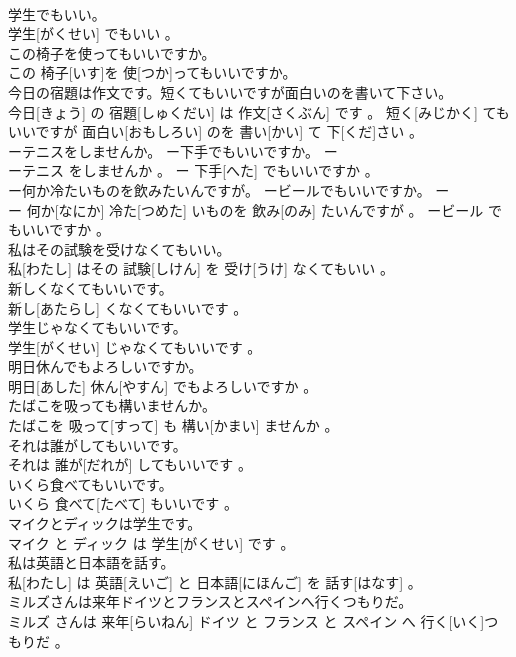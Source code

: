 \documentclass[8pt]{extreport}
\begin{document}
\begin{CJK}{UTF8}{min}
\\	学生でもいい。	
\\	学生[がくせい] でもいい 。
\\	この椅子を使ってもいいですか。	
\\	この 椅子[いす]を 使[つか]ってもいいですか。
\\	今日の宿題は作文です。短くてもいいですが面白いのを書いて下さい。	
\\	今日[きょう] の 宿題[しゅくだい] は 作文[さくぶん] です 。 短く[みじかく] てもいいですが 面白い[おもしろい] のを 書い[かい] て 下[くだ]さい 。
\\	ーテニスをしませんか。 ー下手でもいいですか。	ー
\\	ーテニス をしませんか 。 ー 下手[へた] でもいいですか 。
\\	ー何か冷たいものを飲みたいんですが。 ービールでもいいですか。	ー
\\	ー 何か[なにか] 冷た[つめた] いものを 飲み[のみ] たいんですが 。 ービール でもいいですか 。
\\	私はその試験を受けなくてもいい。	
\\	私[わたし] はその 試験[しけん] を 受け[うけ] なくてもいい 。
\\	新しくなくてもいいです。	
\\	新し[あたらし] くなくてもいいです 。
\\	学生じゃなくてもいいです。	
\\	学生[がくせい] じゃなくてもいいです 。
\\	明日休んでもよろしいですか。	
\\	明日[あした] 休ん[やすん] でもよろしいですか 。
\\	たばこを吸っても構いませんか。	
\\	たばこを 吸って[すって] も 構い[かまい] ませんか 。
\\	それは誰がしてもいいです。	
\\	それは 誰が[だれが] してもいいです 。
\\	いくら食べてもいいです。	
\\	いくら 食べて[たべて] もいいです 。
\\	マイクとディックは学生です。	
\\	マイク と ディック は 学生[がくせい] です 。
\\	私は英語と日本語を話す。	
\\	私[わたし] は 英語[えいご] と 日本語[にほんご] を 話す[はなす] 。
\\	ミルズさんは来年ドイツとフランスとスペインへ行くつもりだ。	
\\	ミルズ さんは 来年[らいねん] ドイツ と フランス と スペイン へ 行く[いく]つもりだ 。

\end{CJK}
\end{document}
